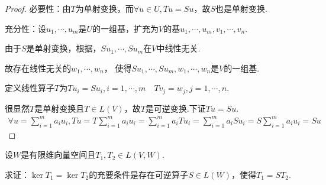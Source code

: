 \begin{proof}
    必要性：由\(T\)为单射变换，而\(\forall u \in U,Tu=Su\)，故\(S\)也是单射变换.
    
    充分性：设\(u_1,\cdots,u_m\)是\(U\)的一组基，扩充为\(V\)的基\(u_1,\cdots,u_m,v_1,\cdots,v_n\).
    
    由于\(S\)是单射变换，根据，\(Su_1,\cdots,Su_m\)在\(V\)中线性无关.
    
    故存在线性无关的\(w_1,\cdots,w_n\)， 使得\(Su_1,\cdots,Su_m,w_1,\cdots,w_n\)是\(V\)的一组基.
    
    定义线性算子\(T\)为\(Tu_i=Su_i,i=1,\cdots,m \quad Tv_j=w_j,j=1,\cdots,n\).
    
    很显然\(T\)是单射变换且\(T \in L(V)\)，故\(T\)是可逆变换.下证\(Tu=Su\).
    \begin{align*}
        \forall u=\sum_{i=1}^m a_iu_i,Tu=T\sum_{i=1}^m a_iu_i
        =\sum_{i=1}^m a_iTu_i=\sum_{i=1}^m a_iSu_i=S\sum_{i=1}^m a_iu_i=Su
    \end{align*}
\end{proof}

\newpage

\begin{problem}[4]\label{3.D.4}
    设\(W\)是有限维向量空间且\(T_1,T_2 \in L(V,W)\).

    求证：\(\ker T_1=\ker T_2\)的充要条件是存在可逆算子\(S \in L(W)\)，使得\(T_1=ST_2\).    
\end{problem}

